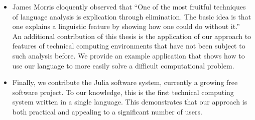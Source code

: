 \begin{itemize}




\item James Morris eloquently observed that
``One of the most fruitful techniques of language analysis is explication through
elimination.
The basic idea is that one explains a linguistic feature by showing
how one could do without it.''~\cite{morris}
An additional contribution of this thesis is the application of our approach to
features of technical computing environments that have not been subject to such
analysis before.
We provide an example application that shows how to use our language to
more easily solve a difficult computational problem.


\item Finally, we contribute the Julia software system, currently a
growing free software project.
To our knowledge, this is the first technical computing system written in a
single language.
This demonstrates that our approach is both practical and appealing to a
significant number of users.

\end{itemize}
